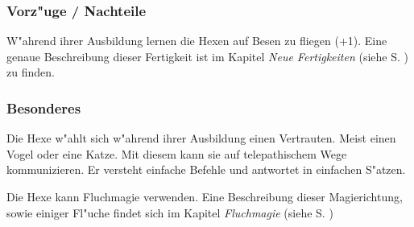 \subsubsection{Vorz"uge / Nachteile}
\par W"ahrend ihrer Ausbildung lernen die Hexen auf Besen zu fliegen
(+1). Eine genaue Beschreibung dieser Fertigkeit ist im Kapitel
\textit{Neue Fertigkeiten} (siehe S. \pageref{neuefertigkeiten}) zu
finden.
\subsubsection{Besonderes}
\par Die Hexe w"ahlt sich w"ahrend ihrer Ausbildung einen Vertrauten.
Meist einen Vogel oder eine Katze. Mit diesem kann sie auf
telepathischem Wege kommunizieren. Er versteht einfache Befehle und
antwortet in einfachen S"atzen.
\par Die Hexe kann Fluchmagie verwenden. Eine Beschreibung dieser
Magierichtung, sowie einiger Fl"uche findet sich im Kapitel
\textit{Fluchmagie} (siehe S. \pageref{fluchmagie})
